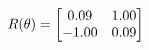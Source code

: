 \documentclass[preview]{standalone}
\begin{document}
\begin{align*}
\special{dvisvgm:raw <g id='unique000'>}R(\theta) = \begin{bmatrix}0.09 & 1.00\\-1.00 & 0.09\end{bmatrix}\special{dvisvgm:raw </g>}
\end{align*}
\end{document}
